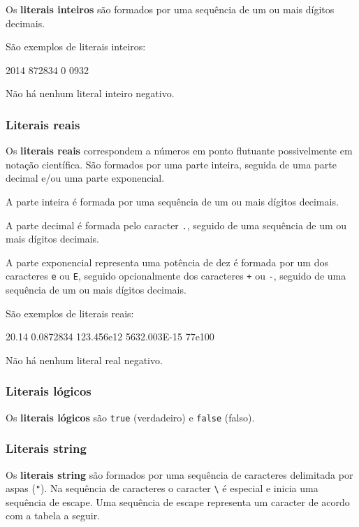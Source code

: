 \documentclass[a4paper,11pt,brazil]{article}
\begin{document}
Os \textbf{literais inteiros} são formados por uma sequência de um ou
mais dígitos decimais.

São exemplos de literais inteiros:
\begin{pygmented}[lang=text]
2014
872834
0
0932
\end{pygmented}

Não há nenhum literal inteiro negativo.

\subsubsection{Literais reais}

Os \textbf{literais reais} correspondem a números em ponto flutuante
possivelmente em notação científica. São formados por uma parte
inteira, seguida de uma parte decimal e/ou uma parte exponencial.

A parte inteira é formada por uma sequência de um ou mais dígitos
decimais.

A parte decimal é formada pelo caracter \texttt{.}, seguido de uma
sequência de um ou mais dígitos decimais.

A parte exponencial representa uma potência de dez é formada por um
dos caracteres \texttt{e} ou \texttt{E}, seguido opcionalmente dos
caracteres \texttt{+} ou \texttt{-}, seguido de uma sequência de um ou
mais dígitos decimais.

São exemplos de literais reais:
\begin{pygmented}[lang=text]
20.14
0.0872834
123.456e12
5632.003E-15
77e100
\end{pygmented}

Não há nenhum literal real negativo.


\subsubsection{Literais lógicos}

Os \textbf{literais lógicos} são \texttt{true} (verdadeiro) e
\texttt{false} (falso).


\subsubsection{Literais string}

Os \textbf{literais string} são formados por uma sequência de
caracteres delimitada por aspas (\texttt{"}). Na sequência de
caracteres o caracter \texttt{\textbackslash} é especial e inicia uma
sequência de escape. Uma sequência de escape representa um caracter de
acordo com a tabela a seguir.
\end{document}
